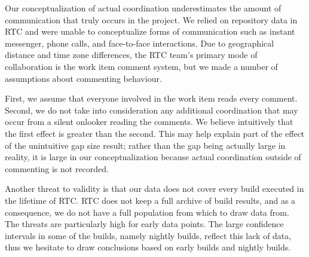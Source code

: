 \documentclass[12pt,oneside]{book}
\begin{document}

Our conceptualization of actual coordination underestimates the amount of communication that truly occurs in the project. 
We relied on repository data in RTC and were unable to conceptualize forms of communication such as instant messenger, phone calls, and face-to-face interactions.
Due to geographical distance and time zone differences, the RTC team's primary mode of collaboration is the work item comment system, but we made a number of assumptions about commenting behaviour.

First, we assume that everyone involved in the work item reads every comment. Second, we do not take into consideration any additional coordination that may occur from a silent onlooker reading the comments. We believe intuitively that the first effect is greater than the second.
This may help explain part of the effect of the unintuitive gap size result; rather than the gap being actually large in reality, it is large in our conceptualization because actual coordination outside of commenting is not recorded.


Another threat to validity is that our data does not cover every build executed in the lifetime of RTC. RTC does not keep a full archive of build results, and as a consequence, we do not have a full population from which to draw data from. The threats are particularly high for early data points. The large confidence intervals in some of the builds, namely nightly builds, reflect this lack of data, thus we hesitate to draw conclusions based on early builds and nightly builds.

\end{document}
